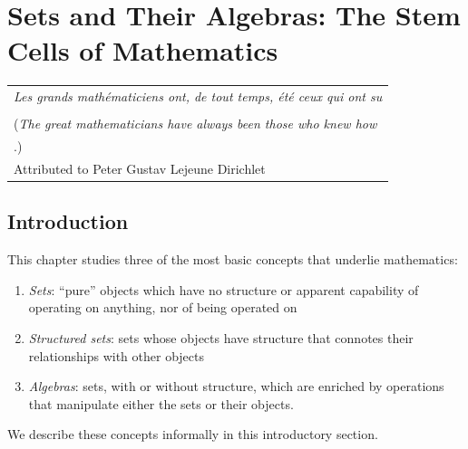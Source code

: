 
\chapter{Sets and Their Algebras:
The Stem Cells of Mathematics}
\label{ch:sets-BA-logic}

\hfill
\begin{tabular}{l}
{\em Les grands math\'{e}maticiens ont, de tout temps, \'{e}t\'{e} ceux qui ont su} \\
\hspace*{.25in}{\em substituer les id\'{e}es au calcul.} \\
({\em The great mathematicians have always been those who knew how} \\
\hspace*{.25in}{\em to substitute thinking for calculating}.) \\
\hfill{\small Attributed to Peter Gustav Lejeune Dirichlet}
\end{tabular}


\vspace*{.5in}


\section{Introduction}

This chapter studies three of the most basic concepts that underlie mathematics:
\begin{enumerate}
\item
{\em Sets}: ``pure'' objects which have no structure or apparent capability of operating on anything, nor of being operated on
\medskip\item
{\em Structured sets}: sets whose objects have structure that connotes their relationships with other objects
\medskip\item
{\em Algebras}: sets, with or without structure, which are enriched by operations that manipulate either the sets or their objects.
\end{enumerate}
We describe these concepts informally in this introductory section.

\bigskip

